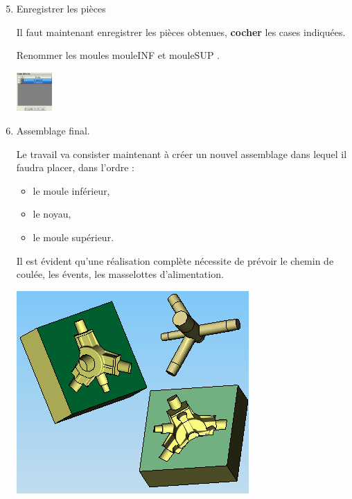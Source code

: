 \begin{enumerate}
 \setcounter{enumi}{4}
 
\item Enregistrer les pièces

\begin{minipage}{0.7\linewidth}
  Il faut maintenant enregistrer les pièces obtenues, \textbf{cocher} les cases indiquées.
 
 Renommer les moules \og mouleINF \fg  et \og mouleSUP \fg. 
\end{minipage}
\hfill
\begin{minipage}{0.29\linewidth}
 \includegraphics[height=1.5cm]{img/SW-043.png}
\end{minipage}

 \item Assemblage final. 

\begin{minipage}{0.64\linewidth}
Le travail va consister maintenant à créer un nouvel assemblage dans lequel il faudra placer, dans l'ordre : 
\begin{itemize}
 \item le moule inférieur,
 \item le noyau,
 \item le moule supérieur. 
\end{itemize}

Il est évident qu'une réalisation complète nécessite de prévoir le chemin de coulée, les évents, les masselottes d'alimentation. 
\end{minipage}
\hfill
\begin{minipage}{0.35\linewidth}
 \includegraphics[width=0.8\linewidth]{img/SW-044.png}
\end{minipage}
\end{enumerate}



